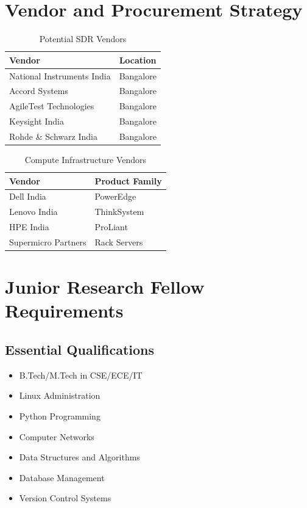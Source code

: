 \documentclass[12pt,a4paper]{article}
\begin{document}
\section{Vendor and Procurement Strategy}
\begin{table}[h]
	\centering
	\caption{Potential SDR Vendors}
	\begin{tabular}{|l|l|}
		\hline
		Vendor & Location \\
		\hline
		National Instruments India & Bangalore \\
		Accord Systems & Bangalore \\
		AgileTest Technologies & Bangalore \\
		Keysight India & Bangalore \\
		Rohde \& Schwarz India & Bangalore \\
		\hline
	\end{tabular}
\end{table}

\begin{table}[h]
	\centering
	\caption{Compute Infrastructure Vendors}
	\begin{tabular}{|l|l|}
		\hline
		Vendor & Product Family \\
		\hline
		Dell India & PowerEdge \\
		Lenovo India & ThinkSystem \\
		HPE India & ProLiant \\
		Supermicro Partners & Rack Servers \\
		\hline
	\end{tabular}
\end{table}


\section{Junior Research Fellow Requirements}
\subsection{Essential Qualifications}

\begin{itemize}
	\item B.Tech/M.Tech in CSE/ECE/IT
	\item Linux Administration
	\item Python Programming
	\item Computer Networks
	\item Data Structures and Algorithms
	\item Database Management
	\item Version Control Systems
\end{itemize}
\end{document}

